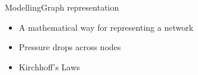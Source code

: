 \begin{frame}{Modelling}{Graph representation}
\begin{itemize}
	\item<1-> A mathematical way for representing a network
	\item<1-> Pressure drops across nodes
	\item<1-> Kirchhoff's Laws 
\end{itemize}
\vspace{-0.5cm}

\end{frame}




